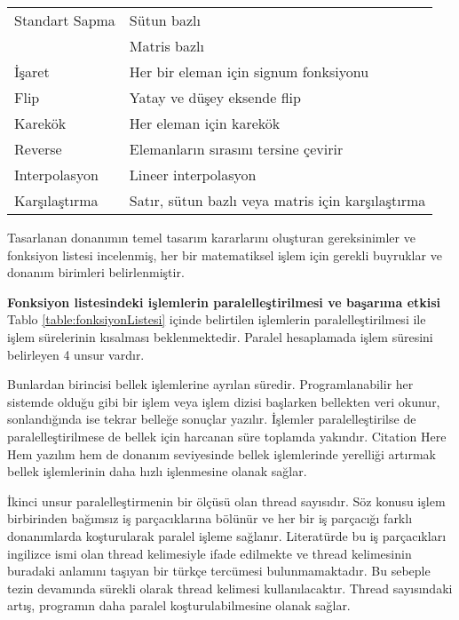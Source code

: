 \begin{longtable}{p{80pt} p{250pt}}
 Standart Sapma					& Sütun bazlı 	 																							\\%
 												& Matris bazlı 	 																							\\%
 İşaret									& Her bir eleman için signum fonksiyonu 											\\%
 Flip										& Yatay ve düşey eksende flip 																\\%
 Karekök 								& Her eleman için karekök 																		\\%
 Reverse 								& Elemanların sırasını tersine çevirir 												\\%
 Interpolasyon 					& Lineer interpolasyon 																				\\%
 Karşılaştırma 					& Satır, sütun bazlı veya matris için karşılaştırma 					\\%
\end{longtable}

Tasarlanan donanımın temel tasarım kararlarını oluşturan gereksinimler ve fonksiyon listesi incelenmiş, her bir matematiksel işlem için gerekli buyruklar ve donanım birimleri belirlenmiştir. 

\textbf{Fonksiyon listesindeki işlemlerin paralelleştirilmesi ve başarıma etkisi}
Tablo \ref{table:fonksiyonListesi} içinde belirtilen işlemlerin paralelleştirilmesi ile işlem sürelerinin kısalması beklenmektedir. Paralel hesaplamada işlem süresini belirleyen 4 unsur vardır. \par

Bunlardan birincisi bellek işlemlerine ayrılan süredir. Programlanabilir her sistemde olduğu gibi bir işlem veya işlem dizisi başlarken bellekten veri okunur, sonlandığında ise tekrar belleğe sonuçlar yazılır. İşlemler paralelleştirilse de paralelleştirilmese de bellek için harcanan süre toplamda yakındır. {Citation Here} Hem yazılım hem de donanım seviyesinde bellek işlemlerinde yerelliği artırmak bellek işlemlerinin daha hızlı işlenmesine olanak sağlar.\par

İkinci unsur paralelleştirmenin bir ölçüsü olan thread sayısıdır. Söz konusu işlem birbirinden bağımsız iş parçacıklarına bölünür ve her bir iş parçacığı farklı donanımlarda koşturularak paralel işleme sağlanır. Literatürde bu iş parçacıkları ingilizce ismi olan thread kelimesiyle ifade edilmekte ve thread kelimesinin buradaki anlamını taşıyan bir türkçe tercümesi bulunmamaktadır. Bu sebeple tezin devamında sürekli olarak thread kelimesi kullanılacaktır. Thread sayısındaki artış, programın daha paralel koşturulabilmesine olanak sağlar.\par

